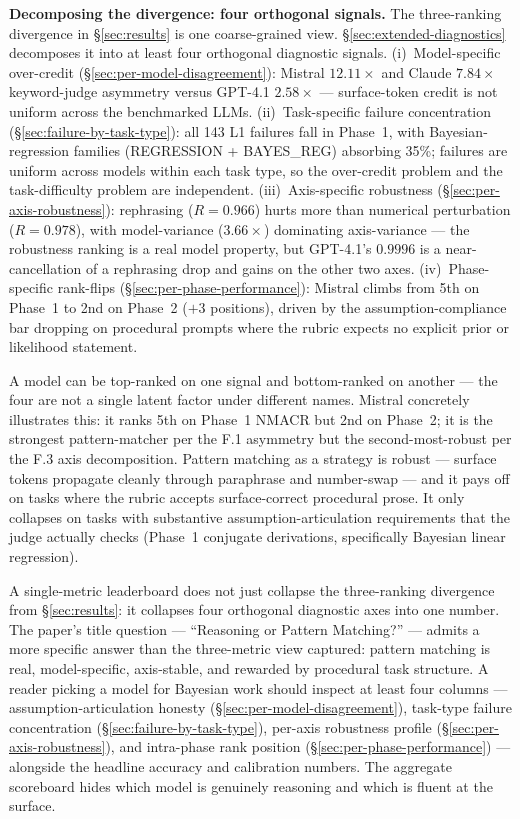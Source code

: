 \textbf{Decomposing the divergence: four orthogonal signals.}
\label{sec:decomposition-synthesis}
The three-ranking divergence in \S\ref{sec:results} is one
coarse-grained view. \S\ref{sec:extended-diagnostics} decomposes
it into at least four orthogonal diagnostic signals.
(i)~Model-specific over-credit
(\S\ref{sec:per-model-disagreement}): Mistral $12.11\times$ and
Claude $7.84\times$ keyword-judge asymmetry versus GPT-4.1
$2.58\times$ --- surface-token credit is not uniform across the
benchmarked LLMs. (ii)~Task-specific failure concentration
(\S\ref{sec:failure-by-task-type}): all 143 L1 failures fall in
Phase~1, with Bayesian-regression families
(REGRESSION + BAYES\_REG) absorbing 35\%; failures are uniform
across models within each task type, so the over-credit problem
and the task-difficulty problem are independent. (iii)~Axis-specific
robustness (\S\ref{sec:per-axis-robustness}): rephrasing
($R=0.966$) hurts more than numerical perturbation ($R=0.978$),
with model-variance ($3.66\times$) dominating axis-variance ---
the robustness ranking is a real model property, but GPT-4.1's
$0.9996$ is a near-cancellation of a rephrasing drop and gains
on the other two axes. (iv)~Phase-specific rank-flips
(\S\ref{sec:per-phase-performance}): Mistral climbs from 5th on
Phase~1 to 2nd on Phase~2 ($+3$ positions), driven by the
assumption-compliance bar dropping on procedural prompts where
the rubric expects no explicit prior or likelihood statement.

A model can be top-ranked on one signal and bottom-ranked on
another --- the four are not a single latent factor under
different names. Mistral concretely illustrates this: it ranks
5th on Phase~1 NMACR but 2nd on Phase~2; it is the strongest
pattern-matcher per the F.1 asymmetry but the second-most-robust
per the F.3 axis decomposition. Pattern matching as a strategy
is robust --- surface tokens propagate cleanly through paraphrase
and number-swap --- and it pays off on tasks where the rubric
accepts surface-correct procedural prose. It only collapses on
tasks with substantive assumption-articulation requirements that
the judge actually checks (Phase~1 conjugate derivations,
specifically Bayesian linear regression).

A single-metric leaderboard does not just collapse the
three-ranking divergence from \S\ref{sec:results}: it collapses
four orthogonal diagnostic axes into one number. The paper's
title question --- ``Reasoning or Pattern Matching?'' --- admits
a more specific answer than the three-metric view captured:
pattern matching is real, model-specific, axis-stable, and
rewarded by procedural task structure. A reader picking a model
for Bayesian work should inspect at least four columns ---
assumption-articulation honesty
(\S\ref{sec:per-model-disagreement}), task-type failure
concentration (\S\ref{sec:failure-by-task-type}), per-axis
robustness profile (\S\ref{sec:per-axis-robustness}), and
intra-phase rank position (\S\ref{sec:per-phase-performance})
--- alongside the headline accuracy and calibration numbers.
The aggregate scoreboard hides which model is genuinely reasoning
and which is fluent at the surface.
